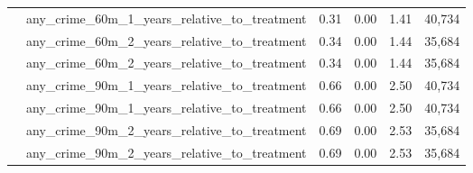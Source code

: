 \begin{tabular}{llcccc}
 & any_crime_60m_1_years_relative_to_treatment & 0.31 & 0.00 & 1.41 & 40,734 \\
 & any_crime_60m_2_years_relative_to_treatment & 0.34 & 0.00 & 1.44 & 35,684 \\
 & any_crime_60m_2_years_relative_to_treatment & 0.34 & 0.00 & 1.44 & 35,684 \\
 & any_crime_90m_1_years_relative_to_treatment & 0.66 & 0.00 & 2.50 & 40,734 \\
 & any_crime_90m_1_years_relative_to_treatment & 0.66 & 0.00 & 2.50 & 40,734 \\
 & any_crime_90m_2_years_relative_to_treatment & 0.69 & 0.00 & 2.53 & 35,684 \\
 & any_crime_90m_2_years_relative_to_treatment & 0.69 & 0.00 & 2.53 & 35,684 \\
\cline{1-6}
\bottomrule
\end{tabular}
